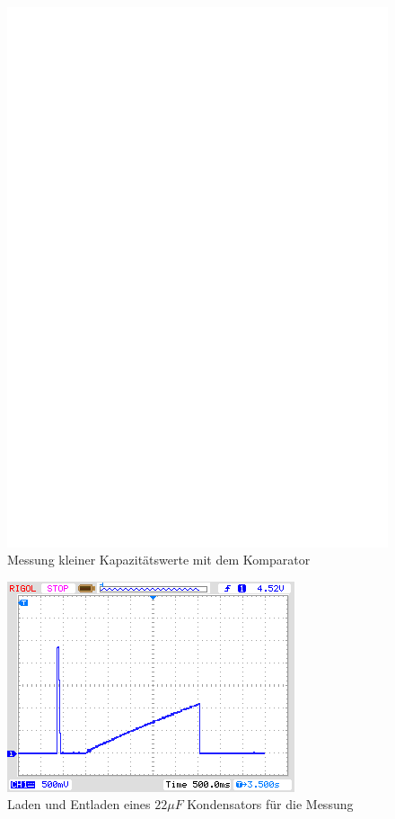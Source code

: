\begin{figure}[H]
\centering
\includegraphics[]{../FIG/Comparat.eps}
\caption{Messung kleiner Kapazit\"atswerte mit dem Komparator}
\label{fig:comparat}
\end{figure}

\begin{figure}[H]
  \centering
    \includegraphics[]{../PNG/charge_22uF.png}
  \caption{Laden und Entladen eines \(22\mu F\) Kondensators f\"ur die Messung}
  \label{pic:c22uF}
\end{figure}


